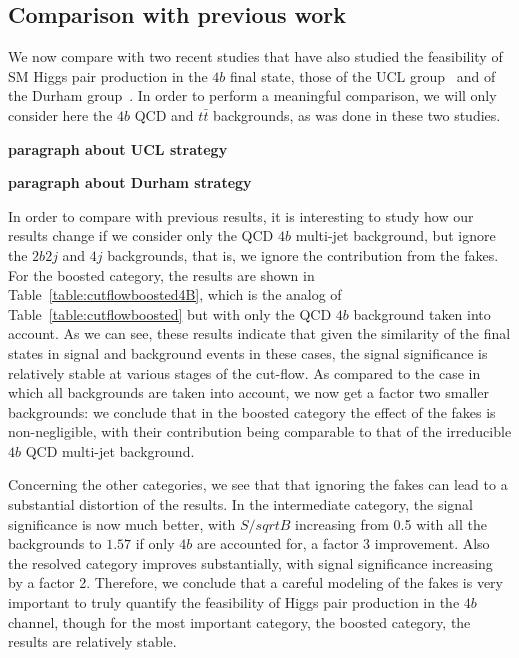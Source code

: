 \subsection{Comparison with previous work}

We now compare with two recent studies that have also studied the
feasibility of SM Higgs pair production in the $4b$ final state,
those of the UCL group~\cite{Wardrope:2014kya} and of the
Durham group~\cite{deLima:2014dta}.
%
In order to perform a meaningful comparison, we will only consider
here the $4b$ QCD and $t\bar{t}$ backgrounds, as was done
in these two studies.

{\bf paragraph about UCL strategy}


{\bf paragraph about Durham strategy}


In order to compare with previous results, it is interesting to
study how our results change if we consider only the QCD $4b$
multi-jet background, but ignore the $2b2j$ and $4j$ backgrounds,
that is, we ignore the contribution from the fakes.
%
For the boosted category, the results are shown in
Table~\ref{table:cutflowboosted4B}, which is the analog of
Table~\ref{table:cutflowboosted} but with only the QCD
$4b$ background taken into account.
%
As we can see, these results indicate that given the similarity of the final states
in signal and background events in these cases, the signal significance is
relatively stable at various stages of the cut-flow.
%
As compared to the case in which all backgrounds are taken into account, we
now get a factor two smaller backgrounds: we conclude that in the boosted category
the effect of the fakes is non-negligible, with their contribution being
comparable to that of the irreducible $4b$ QCD multi-jet background.

Concerning the other categories, we see that that ignoring the fakes can lead to a substantial
distortion of the results.
%
In the intermediate category, the signal significance is now much better, with $S/sqrt{B}$ increasing from
0.5 with all the backgrounds to $1.57$ if only $4b$ are accounted for, a factor 3 improvement.
%
Also the resolved category improves substantially, with signal significance increasing by a factor 2.
%
Therefore, we conclude that a careful modeling of the fakes is very important to truly quantify
the feasibility of Higgs pair production in the $4b$ channel, though for the most
important category, the boosted category, the results are relatively stable.


